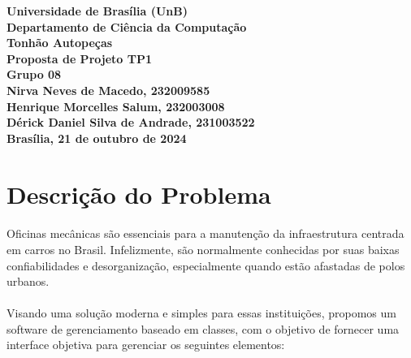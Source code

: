\documentclass[a4paper,12pt]{article}
\begin{document}
\begin{titlepage}
    \begin{center}
        \vspace*{2cm}
        {\Large \textbf{Universidade de Brasília (UnB)}} \\
        {\Large \textbf{Departamento de Ciência da Computação}} \\
        \vspace{3cm}
        {\Huge \textbf{Tonhão Autopeças}} \\
        \vspace{1cm}
        {\Large \textbf{Proposta de Projeto TP1}} \\
        \vspace{2cm}
        {\Large \textbf{Grupo 08}} \\
        \vspace{1cm}
        {\Large \textbf{Nirva Neves de Macedo, 232009585}} \\
        {\Large \textbf{Henrique Morcelles Salum, 232003008}} \\
        {\Large \textbf{Dérick Daniel Silva de Andrade, 231003522}} \\
        \vspace{2cm}
        {\Large \textbf{Brasília, 21 de outubro de 2024}}
    \end{center}
\end{titlepage}

\newpage
\tableofcontents
\newpage

\section{Descrição do Problema}
\paragraph{}
Oficinas mecânicas são essenciais para a manutenção da infraestrutura centrada em carros no Brasil. Infelizmente, são normalmente conhecidas por suas baixas confiabilidades e desorganização, especialmente quando estão afastadas de polos urbanos.

\paragraph{}
Visando uma solução moderna e simples para essas instituições, propomos um software de gerenciamento baseado em classes, com o objetivo de fornecer uma interface objetiva para gerenciar os seguintes elementos:
\end{document}
